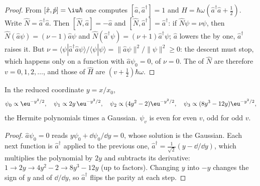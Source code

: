 \begin{proof}
From $[\hat x,\hat p] = \iu\hbar$ one computes $[\hat a,\hat a^\dagger] = 1$ and
$\hat H = \hbar\omega(\hat a^\dagger\hat a + \frac12)$. Write $\hat N =
\hat a^\dagger\hat a$. Then $[\hat N,\hat a] = -\hat a$ and $[\hat N,\hat
a^\dagger] = \hat a^\dagger$: if $\hat N\psi = \nu\psi$, then $\hat N(\hat
a\psi) = (\nu - 1)\hat a\psi$ and $\hat N(\hat a^\dagger\psi) = (\nu + 1)\hat
a^\dagger\psi$; $\hat a$ lowers the  by one, $\hat a^\dagger$ raises
it. But $\nu = \langle\psi|\hat a^\dagger\hat a\psi\rangle/\langle\psi|\psi
\rangle = \|\hat a\psi\|^2/\|\psi\|^2 \ge 0$: the descent must stop, which
happens only on a function with $\hat a\psi_0 = 0$, of  $\nu = 0$.
The  of $\hat N$ are therefore $v = 0, 1, 2, \dots$, and those of
$\hat H$ are $(v + \frac12)\hbar\omega$.
\end{proof}

\begin{proposition}\label{prop:b3:quantum-model-systems:oscillator-functions}
In the reduced coordinate $y = x/x_0$,
\[
\psi_0 \propto \eu^{-y^2/2}, \quad \psi_1 \propto 2y\,\eu^{-y^2/2}, \quad
\psi_2 \propto (4y^2 - 2)\eu^{-y^2/2}, \quad \psi_3 \propto (8y^3 -
12y)\eu^{-y^2/2},
\]
the Hermite polynomials times a Gaussian. $\psi_v$ is even for even $v$,
odd for odd $v$.
\end{proposition}

\begin{proof}
$\hat a\psi_0 = 0$ reads $y\psi_0 + \dd\psi_0/\dd y = 0$, whose solution is the
Gaussian. Each next function is $\hat a^\dagger$ applied to the previous one,
$\hat a^\dagger = \frac{1}{\sqrt2}(y - \dd/\dd y)$, which multiplies the
polynomial by $2y$ and subtracts its derivative: $1 \to 2y \to 4y^2 - 2 \to
8y^3 - 12y$ (up to factors). Changing $y$ into $-y$ changes the sign of $y$
and of $\dd/\dd y$, so $\hat a^\dagger$ flips the parity at each step.
\end{proof}

